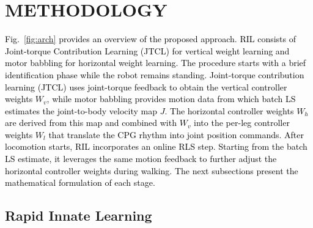 \documentclass[a4paper, 10pt, conference]{ieeeconf}
\newcommand{\vB}{v_B}
\newcommand{\vj}{v_j}
\newcommand{\oldtext}[1]{\textcolor{red}{}}
\newcommand{\newtext}[1]{\textcolor{black}{#1}}
\begin{document}
\section{METHODOLOGY}
\label{sec:method}


\newtext{Fig.~\ref{fig:arch} provides an overview of the proposed approach.
RIL consists of Joint-torque Contribution Learning (JTCL) for vertical weight learning
and motor babbling for horizontal weight learning. The procedure starts with a brief
identification phase while the robot remains standing. Joint-torque contribution learning (JTCL)
uses joint-torque feedback to obtain the vertical controller weights $W_v$, while motor babbling
provides motion data from which batch LS estimates the joint-to-body velocity map
$J$. The horizontal controller weights $W_h$ are derived from this map and
combined with $W_v$ into the per-leg controller weights $W_l$ that translate the
CPG rhythm into joint position commands. After locomotion starts, RIL incorporates
an online RLS step. Starting from the batch LS estimate, it leverages the same motion feedback
to further adjust the horizontal controller weights during walking. The next subsections present
the mathematical formulation of each stage.}

\subsection{Rapid Innate Learning}
\label{sec:ril}
\end{document}
